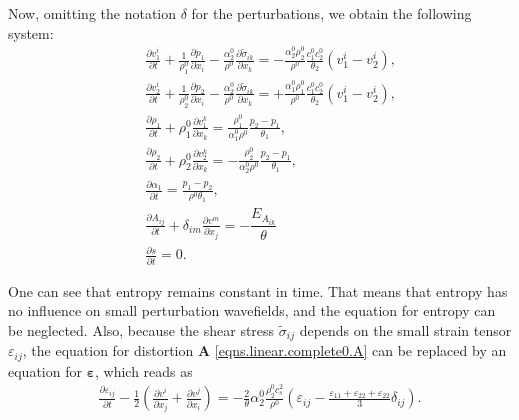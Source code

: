 \documentclass[3p,times,table]{article}
\renewcommand{\AA}{{\bm{A}}}
\begin{document}
Now, omitting the notation $\delta$ for the perturbations, we obtain the 
following system:
\begin{subequations}\label{eqns.linear.complete0}
	\begin{eqnarray}
&&\frac{\partial v^i_1}{\partial t}+
\frac{1}{\rho_1^0}\frac{\partial p_1}{\partial x_i}- \frac{\alpha_2^0}{\rho^0}
\frac{\partial \tilde \sigma_{ik}}{\partial x_k}
=-\frac{\alpha_2^0 \rho_2^0}{\rho^0}\frac{c_1^0c_2^0}{\theta_2}(v_1^i-v_2^i), 
 \\
&&\frac{\partial v^i_2}{\partial t}+
\frac{1}{\rho_2^0}\frac{\partial p_2}{\partial x_i}- \frac{\alpha_2^0}{\rho^0}
\frac{\partial \tilde \sigma_{ik}}{\partial x_k}
=+\frac{\alpha_1^0 \rho_1^0}{\rho^0}\frac{c_1^0c_2^0}{\theta_2}(v_1^i-v_2^i), 
 \\
%
&&\frac{\partial \rho_1}{\partial t}+\rho_1^0 \frac{\partial v^k_1}{\partial 
x_k}=
\frac{\rho_1^0}{\alpha_1^0 \rho^0} \frac{p_2-p_1}{\theta_1},   \\
&&\frac{\partial \rho_2}{\partial t}+\rho_2^0 \frac{\partial v^k_2}{\partial 
x_k}=
-\frac{\rho_2^0}{\alpha_2^0 \rho^0} \frac{p_2-p_1}{\theta_1},   \\
&&\frac{\partial \alpha_1}{\partial t}= \frac{p_1-p_2}{\rho^0 \theta_1},  
 \\
&&\frac{\partial A_{i j}}{\partial t}+\delta_{im}\frac{\partial v^m}{\partial 
x_j}
=-\dfrac{ E_{A_{ik}} }{\theta} \label{eqns.linear.complete0.A} \\
&&\frac{\partial s}{\partial t}=0.  
\end{eqnarray}
\end{subequations}

One can see that entropy remains constant in time. That means that  
entropy 
has no influence on small perturbation wavefields, and the equation for 
entropy can be neglected. Also, because the shear stress $\tilde \sigma_{ij}$ 
depends on the small strain tensor $\varepsilon_{ij}$,  the equation for 
distortion $\AA$ \eqref{eqns.linear.complete0.A} can be replaced by an
equation 
for $\bm{\varepsilon}$, which reads as
\begin{align}
\frac{\partial \varepsilon_{ij}}{\partial t} - 
\frac{1}{2}\left(\frac{\partial v^i}{\partial x_j}+\frac{\partial v^j}{\partial x_i} \right) = 
-\frac{2}{\theta}\alpha_2^0 \frac{\rho_2^0 c^2_s}{\rho^0} \left(\varepsilon_{ij}-\frac{\varepsilon_{11}+\varepsilon_{22}+\varepsilon_{22}}{3}\delta_{ij}\right).
\end{align}
\end{document}
